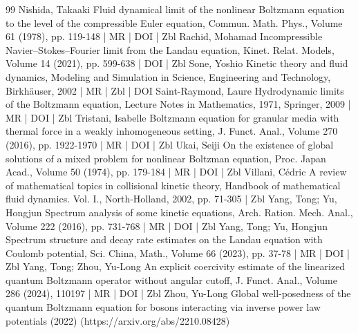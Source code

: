 \begin{thebibliography}{99}
 Nishida, Takaaki Fluid dynamical limit of the nonlinear Boltzmann equation to the level of the compressible Euler equation, Commun. Math. Phys., Volume 61 (1978), pp. 119-148 | MR | DOI | Zbl
 Rachid, Mohamad Incompressible Navier–Stokes–Fourier limit from the Landau equation, Kinet. Relat. Models, Volume 14 (2021), pp. 599-638 | DOI | Zbl
 Sone, Yoshio Kinetic theory and fluid dynamics, Modeling and Simulation in Science, Engineering and Technology, Birkhäuser, 2002 | MR | Zbl | DOI
 Saint-Raymond, Laure Hydrodynamic limits of the Boltzmann equation, Lecture Notes in Mathematics, 1971, Springer, 2009 | MR | DOI | Zbl
 Tristani, Isabelle Boltzmann equation for granular media with thermal force in a weakly inhomogeneous setting, J. Funct. Anal., Volume 270 (2016), pp. 1922-1970 | MR | DOI | Zbl
 Ukai, Seiji On the existence of global solutions of a mixed problem for nonlinear Boltzman equation, Proc. Japan Acad., Volume 50 (1974), pp. 179-184 | MR | DOI | Zbl
 Villani, Cédric A review of mathematical topics in collisional kinetic theory, Handbook of mathematical fluid dynamics. Vol. I., North-Holland, 2002, pp. 71-305 | Zbl
 Yang, Tong; Yu, Hongjun Spectrum analysis of some kinetic equations, Arch. Ration. Mech. Anal., Volume 222 (2016), pp. 731-768 | MR | DOI | Zbl
 Yang, Tong; Yu, Hongjun Spectrum structure and decay rate estimates on the Landau equation with Coulomb potential, Sci. China, Math., Volume 66 (2023), pp. 37-78 | MR | DOI | Zbl
 Yang, Tong; Zhou, Yu-Long An explicit coercivity estimate of the linearized quantum Boltzmann operator without angular cutoff, J. Funct. Anal., Volume 286 (2024), 110197 | MR | DOI | Zbl
 Zhou, Yu-Long Global well-posedness of the quantum Boltzmann equation for bosons interacting via inverse power law potentials (2022) (https://arxiv.org/abs/2210.08428)
\end{thebibliography}
